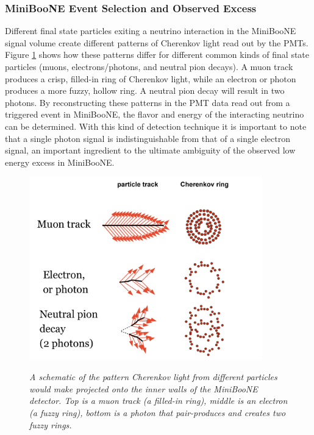 \subsubsection{MiniBooNE Event Selection and Observed Excess}

Different final state particles exiting a neutrino interaction in the MiniBooNE signal volume create different patterns of Cherenkov light read out by the PMTs. Figure \ref{georgia_cherenkov_cartoon_fig} \cite{GeorgiaThesis} shows how these patterns differ for different common kinds of final state particles (muons, electrons/photons, and neutral pion decays). A muon track produces a crisp, filled-in ring of Cherenkov light, while an electron or photon produces a more fuzzy, hollow ring. A neutral pion decay will result in two photons. By reconstructing these patterns in the PMT data read out from a triggered event in MiniBooNE, the flavor and energy of the interacting neutrino can be determined. With this kind of detection technique it is important to note that a single photon signal is indistinguishable from that of a single electron signal, an important ingredient to the ultimate ambiguity of the observed low energy excess in MiniBooNE.\\

\begin{figure}[ht!]
\centering
	\includegraphics[width=0.9\textwidth]{Figures/georgia_cherenkov_cartoon.png} \\
\caption{\textit{A schematic of the pattern Cherenkov light from different particles would make projected onto the inner walls of the MiniBooNE detector. Top is a muon track (a filled-in ring), middle is an electron (a fuzzy ring), bottom is a photon that pair-produces and creates two fuzzy rings.}}\label{georgia_cherenkov_cartoon_fig}
\end{figure}

